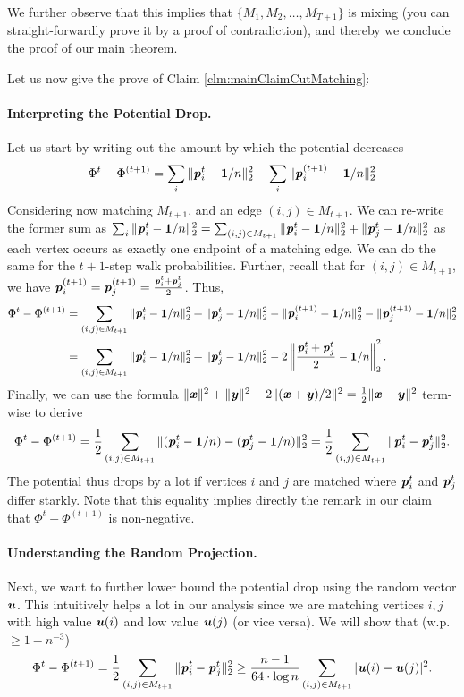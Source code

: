 We further observe that this implies that $\{M_1, M_2, \dots, M_{T+1}\}$ is mixing (you can straight-forwardly prove it by a proof of contradiction), and thereby we conclude the proof of our main theorem. 

Let us now give the prove of Claim \ref{clm:mainClaimCutMatching}: 

\paragraph{Interpreting the Potential Drop.} Let us start by writing out the amount by which the potential decreases 
\begin{align*}
     \Phi^{t} - \Phi^{(t+1)} = \sum_{i} \|\boldsymbol{\mathit{p}}_{i}^t -\boldsymbol{1}/n\|_2^2 - \sum_{i} \|\boldsymbol{\mathit{p}}_{i}^{(t+1)} -\boldsymbol{1}/n\|_2^2
\end{align*}
Considering now matching $M_{t+1}$,  and an edge $(i,j) \in M_{t+1}$. We can re-write the former sum as $\sum_{i} \|\boldsymbol{\mathit{p}}_{i}^t -\boldsymbol{1}/n\|_2^2 = \sum_{(i,j) \in M_{t+1}} \|\boldsymbol{\mathit{p}}_{i}^t -\boldsymbol{1}/n\|_2^2 + \|\boldsymbol{\mathit{p}}_{j}^t -\boldsymbol{1}/n\|_2^2$ as each vertex occurs as exactly one endpoint of a matching edge. We can do the same for the $t+1$-step walk probabilities. Further, recall that for $(i,j) \in M_{t+1}$, we have $\boldsymbol{\mathit{p}}_i^{(t+1)} = \boldsymbol{\mathit{p}}_j^{(t+1)} = \frac{\boldsymbol{\mathit{p}}_i^t+ \boldsymbol{\mathit{p}}_j^t}{2}$. Thus,
\begin{align*}
     \Phi^{t} - \Phi^{(t+1)} &= \sum_{(i,j) \in M_{t+1}}  \|\boldsymbol{\mathit{p}}_{i}^t -\boldsymbol{1}/n\|_2^2 + \|\boldsymbol{\mathit{p}}_{j}^t -\boldsymbol{1}/n\|_2^2 -  \|\boldsymbol{\mathit{p}}_{i}^{(t+1)} -\boldsymbol{1}/n\|_2^2 - \|\boldsymbol{\mathit{p}}_{j}^{(t+1)} -\boldsymbol{1}/n\|_2^2\\
     &= \sum_{(i,j)\in M_{t+1}}  \|\boldsymbol{\mathit{p}}_{i}^t -\boldsymbol{1}/n\|_2^2 + \|\boldsymbol{\mathit{p}}_{j}^t -\boldsymbol{1}/n\|_2^2 - 2 \left\|\frac{\boldsymbol{\mathit{p}}_i^t+ \boldsymbol{\mathit{p}}_j^t}{2} - \boldsymbol{1}/n \right\|_2^2.
\end{align*}
Finally, we can use the formula $\|\boldsymbol{\mathit{x}}\|^2 + \|\boldsymbol{\mathit{y}}\|^2 - 2 \|(\boldsymbol{\mathit{x}} + \boldsymbol{\mathit{y}})/2\|^2 = \frac{1}{2} \| \boldsymbol{\mathit{x}} - \boldsymbol{\mathit{y}}\|^2$ term-wise to derive 
\begin{align*}
     \Phi^{t} - \Phi^{(t+1)} = \frac{1}{2}\sum_{(i,j) \in M_{t+1}} \|(\boldsymbol{\mathit{p}}_{i}^t -\boldsymbol{1}/n) - (\boldsymbol{\mathit{p}}_{j}^t -\boldsymbol{1}/n)\|_2^2 = \frac{1}{2}\sum_{(i,j) \in M_{t+1}} \|\boldsymbol{\mathit{p}}_{i}^t - \boldsymbol{\mathit{p}}_{j}^t \|_2^2.
\end{align*}
The potential thus drops by a lot if vertices $i$ and $j$ are matched where $\boldsymbol{\mathit{p}}_{i}^t$ and $\boldsymbol{\mathit{p}}_{j}^t$ differ starkly. Note that this equality implies directly the remark in our claim that $\Phi^t - \Phi^{(t+1)}$ is non-negative.

\paragraph{Understanding the Random Projection.} Next, we want to further lower bound the potential drop using the random vector $\boldsymbol{\mathit{u}}$. This intuitively helps a lot in our analysis since we are matching vertices $i,j$ with high value $\boldsymbol{\mathit{u}}(i)$ and low value $\boldsymbol{\mathit{u}}(j)$ (or vice versa). We will show that (w.p. $\geq 1-n^{-3}$)
\begin{align}\label{eq:cutMatchingAnalysis}
     \Phi^{t} - \Phi^{(t+1)} = \frac{1}{2} \sum_{(i,j) \in M_{t+1}} \|\boldsymbol{\mathit{p}}_{i}^t - \boldsymbol{\mathit{p}}_{j}^t \|_2^2 \geq \frac{n-1}{64 \cdot \log n} \sum_{(i,j) \in M_{t+1}} |\boldsymbol{\mathit{u}}(i) - \boldsymbol{\mathit{u}}(j)|^2.
\end{align}

